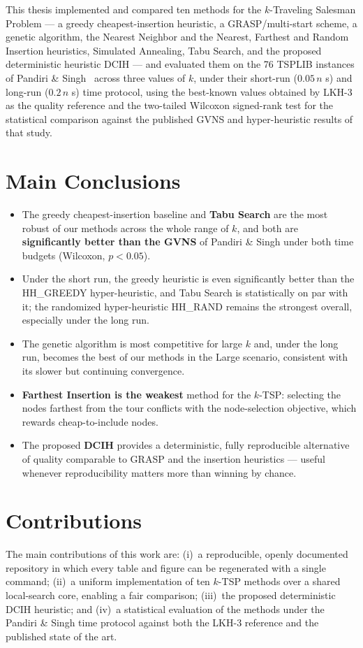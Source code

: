 \documentclass[12pt,a4paper,oneside]{report}
\begin{document}
This thesis implemented and compared ten methods for the $k$-Traveling Salesman
Problem --- a greedy cheapest-insertion heuristic, a GRASP/multi-start scheme, a
genetic algorithm, the Nearest Neighbor and the Nearest, Farthest and Random
Insertion heuristics, Simulated Annealing, Tabu Search, and the proposed
deterministic heuristic DCIH --- and evaluated them on the 76 TSPLIB instances of
Pandiri \& Singh~\cite{pandiri2020} across three values of $k$, under their
short-run ($0.05\,n$ s) and long-run ($0.2\,n$ s) time protocol, using the
best-known values obtained by LKH-3 as the quality reference and the two-tailed
Wilcoxon signed-rank test for the statistical comparison against the published
GVNS and hyper-heuristic results of that study.

\section{Main Conclusions}
\begin{itemize}[leftmargin=*]
  \item The greedy cheapest-insertion baseline and \textbf{Tabu Search} are the
  most robust of our methods across the whole range of $k$, and both are
  \textbf{significantly better than the GVNS} of Pandiri \& Singh under both time
  budgets (Wilcoxon, $p<0.05$).
  \item Under the short run, the greedy heuristic is even significantly better than
  the HH\_GREEDY hyper-heuristic, and Tabu Search is statistically on par with it;
  the randomized hyper-heuristic HH\_RAND remains the strongest overall, especially
  under the long run.
  \item The genetic algorithm is most competitive for large $k$ and, under the long
  run, becomes the best of our methods in the Large scenario, consistent with its
  slower but continuing convergence.
  \item \textbf{Farthest Insertion is the weakest} method for the $k$-TSP:
  selecting the nodes farthest from the tour conflicts with the node-selection
  objective, which rewards cheap-to-include nodes.
  \item The proposed \textbf{DCIH} provides a deterministic, fully reproducible
  alternative of quality comparable to GRASP and the insertion heuristics ---
  useful whenever reproducibility matters more than winning by chance.
\end{itemize}

\section{Contributions}
The main contributions of this work are: (i)~a reproducible, openly documented
repository in which every table and figure can be regenerated with a single
command; (ii)~a uniform implementation of ten $k$-TSP methods over a shared
local-search core, enabling a fair comparison; (iii)~the proposed deterministic
DCIH heuristic; and (iv)~a statistical evaluation of the methods under the Pandiri
\& Singh time protocol against both the LKH-3 reference and the published state of
the art.
\end{document}
